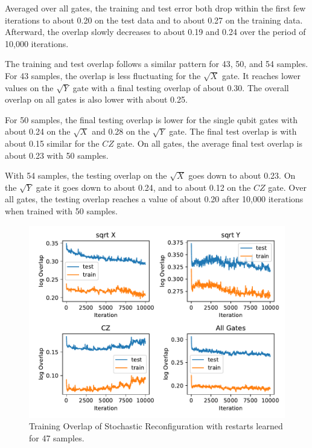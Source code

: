 Averaged over all gates, the training and test error both drop within the first few iterations to about 
0.20 on the test data and to about 0.27 on the training data. Afterward, the overlap slowly decreases to about 0.19 and 
0.24 over the period of 10,000 iterations.

The training and test overlap follows a similar pattern for 43, 50, and 54 samples. For 43 samples, the 
overlap is less fluctuating for the $\sqrt{X}$ gate. It reaches lower values on the $\sqrt{Y}$ gate with 
a final testing overlap of about 0.30. The overall overlap on all gates is also lower with about 0.25.

For 50 samples, the final testing overlap is lower for the single qubit gates with about 0.24 on the $\sqrt{X}$
and 0.28 on the $\sqrt{Y}$ gate. The final test overlap is with about 0.15 similar for the $CZ$ gate. On all gates, 
the average final test overlap is about 0.23 with 50 samples.

With 54 samples, the testing overlap on the $\sqrt{X}$ goes down to about 0.23. On the $\sqrt{Y}$ gate it goes 
down to about 0.24, and to about 0.12 on the $CZ$ gate. Over all gates, the testing overlap reaches a value of about 
0.20 after 10,000 iterations when trained with 50 samples.

\begin{figure}[H]
  \centering
  \includegraphics[width=\textwidth]{figures/results/SR-restarts-learned/avgOverlap_47.pdf}
  \caption[Training and Testing Overlaps for Stochastic Reconfiguration with Random Restarts and $CZ$ Gates Learned - 47 Samples]{Training 
  Overlap of Stochastic Reconfiguration with restarts learned for 47 samples.}
  \label{fig:sr_restarts_overlap_47}
\end{figure}

